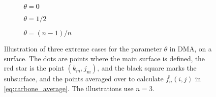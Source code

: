 \begin{figure}[htpb]%
    \centering%
    \vspace{1em}%
    \begin{subfigure}[b]{0.25\textwidth}%
        \caption{$\theta = 0$}%
        \label{fig:DMA_theta_a}%
    \end{subfigure}%
    \hspace{0.1\textwidth}%
    \begin{subfigure}[b]{0.25\textwidth}%
        \caption{$\theta = 1/2$}%
        \label{fig:DMA_theta_b}%
    \end{subfigure}%
    \hspace{0.1\textwidth}%
    \begin{subfigure}[b]{0.25\textwidth}%
        \caption{$\theta = (n-1)/n$}%
        \label{fig:DMA_theta_c}%
    \end{subfigure}%
        \caption{%
            Illustration of three extreme cases for the parameter $\theta$ in DMA, on a surface. The dots are points where the main surface is defined, the red star is the point $(k_m,j_m)$, and the black square marks the subsurface, and the points averaged over to calculate $\bar {f_n}(i,j)$ in \cref{eq:carbone_average}. The illustrations use $n = 3$.%
        \label{fig:DMA_theta}%
    }%
\end{figure}%

